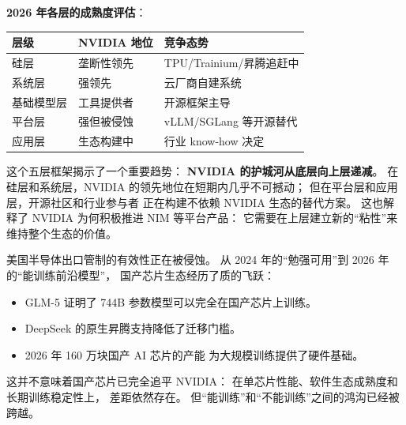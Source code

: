\textbf{2026 年各层的成熟度评估}：
\begin{center}\small
\renewcommand{\arraystretch}{1.3}
\begin{tabular}{lll}
\toprule
\rowcolor{figLightGray}
\textbf{层级} & \textbf{NVIDIA 地位} & \textbf{竞争态势} \\
\midrule
硅层 & 垄断性领先 & TPU/Trainium/昇腾追赶中 \\
系统层 & 强领先 & 云厂商自建系统 \\
基础模型层 & 工具提供者 & 开源框架主导 \\
平台层 & 强但被侵蚀 & vLLM/SGLang 等开源替代 \\
应用层 & 生态构建中 & 行业 know-how 决定 \\
\bottomrule
\end{tabular}
\end{center}

这个五层框架揭示了一个重要趋势：
\textbf{NVIDIA 的护城河从底层向上层递减}。
在硅层和系统层，NVIDIA 的领先地位在短期内几乎不可撼动；
但在平台层和应用层，开源社区和行业参与者
正在构建不依赖 NVIDIA 生态的替代方案。
这也解释了 NVIDIA 为何积极推进 NIM 等平台产品：
它需要在上层建立新的“粘性”来维持整个生态的价值。

\begin{keybox}[国产算力的战略意义]
美国半导体出口管制的有效性正在被侵蚀。
从 2024 年的“勉强可用”到 2026 年的“能训练前沿模型”，
国产芯片生态经历了质的飞跃：
\begin{itemize}[noitemsep]
  \item GLM-5 证明了 744B 参数模型可以完全在国产芯片上训练。
  \item DeepSeek 的原生昇腾支持降低了迁移门槛。
  \item 2026 年 160 万块国产 AI 芯片的产能
        为大规模训练提供了硬件基础。
\end{itemize}
这并不意味着国产芯片已完全追平 NVIDIA：
在单芯片性能、软件生态成熟度和长期训练稳定性上，
差距依然存在。
但“能训练”和“不能训练”之间的鸿沟已经被跨越。
\end{keybox}


